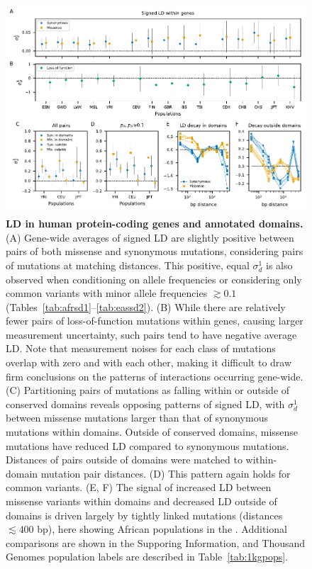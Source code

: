 \documentclass[]{article}
\begin{document}
\begin{figure}[tb!]
    \internallinenumbers
    \centering
    \includegraphics{../figures/data_compact}
    \caption{
        \textbf{LD in human protein-coding genes and annotated domains.}
        (A) Gene-wide averages of signed LD are slightly positive between pairs
        of both missense and synonymous mutations, considering pairs of mutations
        at matching distances. This positive, equal \(\sigma_d^1\) is also observed
        when conditioning on allele frequencies or considering only common variants
        with minor allele frequencies \(\gtrsim 0.1\)
        (Tables~\ref{tab:afrsd1}--\ref{tab:eassd2}).
        (B) While there are relatively fewer pairs of loss-of-function mutations
        within genes, causing larger measurement uncertainty, such pairs tend to have
        negative average LD. Note that measurement noises for each class of
        mutations overlap with zero and with each other, making it difficult to
        draw firm conclusions on the patterns of interactions occurring gene-wide.
        (C) Partitioning pairs of mutations as falling within or outside
        of conserved domains reveals opposing patterns of signed LD, with
        \(\sigma_d^1\) between missense mutations larger than that of synonymous
        mutations within domains. Outside of conserved domains, missense mutations
        have reduced LD compared to synonymous mutations. Distances of pairs outside
        of domains were matched to within-domain mutation pair distances.
        (D) This pattern again holds for common variants.
        (E, F) The signal of increased LD between missense variants within domains
        and decreased LD outside of domains is driven largely by tightly linked
        mutations (distances \(\lesssim 400\) bp), here showing African populations
        in the \citet{1000_Genomes_Project_Consortium2015-zq}.
        Additional comparisons are shown in the Supporing Information, and Thousand
        Genomes population labels are described in Table~\ref{tab:1kgpops}.
    }
    \label{fig:data}
\end{figure}
\end{document}
